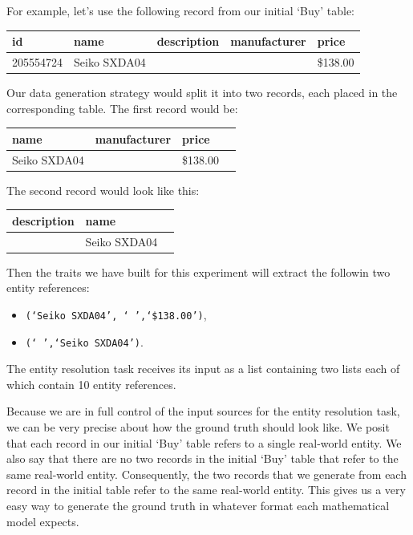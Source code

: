 \documentclass[11pt]{article}
\begin{document}
    For example, let's use the following record from our initial `Buy' table:
    \begin{center}
        \begin{tabular}[b]{|l|l|l|l|l|}
            \hline
            id&name&description&manufacturer&price\\
            \hline
            205554724&Seiko SXDA04& & &\$138.00\\
            \hline
        \end{tabular}
    \end{center}

    Our data generation strategy would split it into two records, each placed
    in the corresponding table.
    The first record would be:
    
    \begin{center}
        \begin{tabular}[b]{|l|l|l|l|}
            \hline
            name&manufacturer&price \\
            \hline
            Seiko SXDA04& &\$138.00 \\
            \hline
        \end{tabular}
    \end{center}

    The second record would look like this:

    \begin{center}
        \begin{tabular}[b]{|l|l|l|}
            \hline
            description&name \\
            \hline
            &Seiko SXDA04 \\
            \hline
        \end{tabular}
    \end{center}

    Then the traits we have built for this experiment will extract the followin
    two entity references:
    \begin{itemize}
        \item \texttt{(`Seiko SXDA04', ` ',`\$138.00')},
        \item \texttt{(` ',`Seiko SXDA04')}.
    \end{itemize}

    The entity resolution task receives its input as a list containing two lists
    each of which contain 10 entity references.

    Because we are in full control of the input sources for the entity
    resolution task, we can be very precise about how the ground truth should
    look like.
    We posit that each record in our initial `Buy' table refers to a single
    real-world entity.
    We also say that there are no two records in the initial `Buy' table that
    refer to the same real-world entity.
    Consequently, the two records that we generate from each record in the
    initial table refer to the same real-world entity.
    This gives us a very easy way to generate the ground truth in whatever
    format each mathematical model expects.
\end{document}
